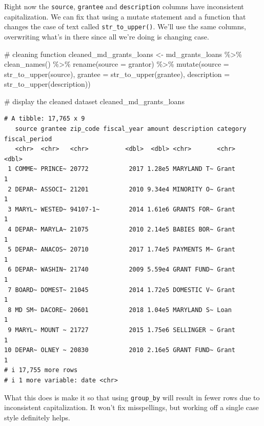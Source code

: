 \documentclass[
  letterpaper,
  DIV=11,
  numbers=noendperiod]{scrreprt}
\newenvironment{Shaded}{\begin{snugshade}}{\end{snugshade}}
\newcommand{\AttributeTok}[1]{\textcolor[rgb]{0.40,0.45,0.13}{#1}}
\newcommand{\CommentTok}[1]{\textcolor[rgb]{0.37,0.37,0.37}{#1}}
\newcommand{\FunctionTok}[1]{\textcolor[rgb]{0.28,0.35,0.67}{#1}}
\newcommand{\NormalTok}[1]{\textcolor[rgb]{0.00,0.23,0.31}{#1}}
\newcommand{\OtherTok}[1]{\textcolor[rgb]{0.00,0.23,0.31}{#1}}
\newcommand{\SpecialCharTok}[1]{\textcolor[rgb]{0.37,0.37,0.37}{#1}}
\begin{document}
Right now the \texttt{source}, \texttt{grantee} and \texttt{description}
columns have inconsistent capitalization. We can fix that using a mutate
statement and a function that changes the case of text called
\texttt{str\_to\_upper()}. We'll use the same columns, overwriting
what's in there since all we're doing is changing case.

\begin{Shaded}
\begin{Highlighting}[]
\CommentTok{\# cleaning function}
\NormalTok{cleaned\_md\_grants\_loans }\OtherTok{\textless{}{-}}\NormalTok{ md\_grants\_loans }\SpecialCharTok{\%\textgreater{}\%}
  \FunctionTok{clean\_names}\NormalTok{() }\SpecialCharTok{\%\textgreater{}\%} 
  \FunctionTok{rename}\NormalTok{(}\AttributeTok{source =}\NormalTok{ grantor) }\SpecialCharTok{\%\textgreater{}\%} 
  \FunctionTok{mutate}\NormalTok{(}\AttributeTok{source =} \FunctionTok{str\_to\_upper}\NormalTok{(source), }\AttributeTok{grantee =} \FunctionTok{str\_to\_upper}\NormalTok{(grantee), }\AttributeTok{description =} \FunctionTok{str\_to\_upper}\NormalTok{(description))}

\CommentTok{\# display the cleaned dataset}
\NormalTok{cleaned\_md\_grants\_loans}
\end{Highlighting}
\end{Shaded}

\begin{verbatim}
# A tibble: 17,765 x 9
   source grantee zip_code fiscal_year amount description category fiscal_period
   <chr>  <chr>   <chr>          <dbl>  <dbl> <chr>       <chr>            <dbl>
 1 COMME~ PRINCE~ 20772           2017 1.28e5 MARYLAND T~ Grant                1
 2 DEPAR~ ASSOCI~ 21201           2010 9.34e4 MINORITY O~ Grant                1
 3 MARYL~ WESTED~ 94107-1~        2014 1.61e6 GRANTS FOR~ Grant                1
 4 DEPAR~ MARYLA~ 21075           2010 2.14e5 BABIES BOR~ Grant                1
 5 DEPAR~ ANACOS~ 20710           2017 1.74e5 PAYMENTS M~ Grant                1
 6 DEPAR~ WASHIN~ 21740           2009 5.59e4 GRANT FUND~ Grant                1
 7 BOARD~ DOMEST~ 21045           2014 1.72e5 DOMESTIC V~ Grant                1
 8 MD SM~ DACORE~ 20601           2018 1.04e5 MARYLAND S~ Loan                 1
 9 MARYL~ MOUNT ~ 21727           2015 1.75e6 SELLINGER ~ Grant                1
10 DEPAR~ OLNEY ~ 20830           2010 2.16e5 GRANT FUND~ Grant                1
# i 17,755 more rows
# i 1 more variable: date <chr>
\end{verbatim}

What this does is make it so that using \texttt{group\_by} will result
in fewer rows due to inconsistent capitalization. It won't fix
misspellings, but working off a single case style definitely helps.
\end{document}

